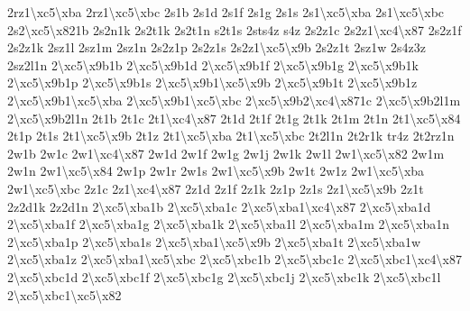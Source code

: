 {2rz1\textbackslash{}xc5\textbackslash{}xba 2rz1\textbackslash{}xc5\textbackslash{}xbc 2s1b 2s1d 2s1f 2s1g 2s1s 2s1\textbackslash{}xc5\textbackslash{}xba 2s1\textbackslash{}xc5\textbackslash{}xbc 2s2\textbackslash{}xc5\textbackslash{}x821b 2s2n1k 2s2t1k 2s2t1n s2t1s 2sts4z s4z 2s2z1c 2s2z1\textbackslash{}xc4\textbackslash{}x87 2s2z1f 2s2z1k 2sz1l 2sz1m 2sz1n 2s2z1p 2s2z1s 2s2z1\textbackslash{}xc5\textbackslash{}x9b 2s2z1t 2sz1w 2s4z3z 2sz2l1n 2\textbackslash{}xc5\textbackslash{}x9b1b 2\textbackslash{}xc5\textbackslash{}x9b1d 2\textbackslash{}xc5\textbackslash{}x9b1f 2\textbackslash{}xc5\textbackslash{}x9b1g 2\textbackslash{}xc5\textbackslash{}x9b1k 2\textbackslash{}xc5\textbackslash{}x9b1p 2\textbackslash{}xc5\textbackslash{}x9b1s 2\textbackslash{}xc5\textbackslash{}x9b1\textbackslash{}xc5\textbackslash{}x9b 2\textbackslash{}xc5\textbackslash{}x9b1t 2\textbackslash{}xc5\textbackslash{}x9b1z 2\textbackslash{}xc5\textbackslash{}x9b1\textbackslash{}xc5\textbackslash{}xba 2\textbackslash{}xc5\textbackslash{}x9b1\textbackslash{}xc5\textbackslash{}xbc 2\textbackslash{}xc5\textbackslash{}x9b2\textbackslash{}xc4\textbackslash{}x871c 2\textbackslash{}xc5\textbackslash{}x9b2l1m 2\textbackslash{}xc5\textbackslash{}x9b2l1n 2t1b 2t1c 2t1\textbackslash{}xc4\textbackslash{}x87 2t1d 2t1f 2t1g 2t1k 2t1m 2t1n 2t1\textbackslash{}xc5\textbackslash{}x84 2t1p 2t1s 2t1\textbackslash{}xc5\textbackslash{}x9b 2t1z 2t1\textbackslash{}xc5\textbackslash{}xba 2t1\textbackslash{}xc5\textbackslash{}xbc 2t2l1n 2t2r1k tr4z 2t2rz1n 2w1b 2w1c 2w1\textbackslash{}xc4\textbackslash{}x87 2w1d 2w1f 2w1g 2w1j 2w1k 2w1l 2w1\textbackslash{}xc5\textbackslash{}x82 2w1m 2w1n 2w1\textbackslash{}xc5\textbackslash{}x84 2w1p 2w1r 2w1s 2w1\textbackslash{}xc5\textbackslash{}x9b 2w1t 2w1z 2w1\textbackslash{}xc5\textbackslash{}xba 2w1\textbackslash{}xc5\textbackslash{}xbc 2z1c 2z1\textbackslash{}xc4\textbackslash{}x87 2z1d 2z1f 2z1k 2z1p 2z1s 2z1\textbackslash{}xc5\textbackslash{}x9b 2z1t 2z2d1k 2z2d1n 2\textbackslash{}xc5\textbackslash{}xba1b 2\textbackslash{}xc5\textbackslash{}xba1c 2\textbackslash{}xc5\textbackslash{}xba1\textbackslash{}xc4\textbackslash{}x87 2\textbackslash{}xc5\textbackslash{}xba1d 2\textbackslash{}xc5\textbackslash{}xba1f 2\textbackslash{}xc5\textbackslash{}xba1g 2\textbackslash{}xc5\textbackslash{}xba1k 2\textbackslash{}xc5\textbackslash{}xba1l 2\textbackslash{}xc5\textbackslash{}xba1m 2\textbackslash{}xc5\textbackslash{}xba1n 2\textbackslash{}xc5\textbackslash{}xba1p 2\textbackslash{}xc5\textbackslash{}xba1s 2\textbackslash{}xc5\textbackslash{}xba1\textbackslash{}xc5\textbackslash{}x9b 2\textbackslash{}xc5\textbackslash{}xba1t 2\textbackslash{}xc5\textbackslash{}xba1w 2\textbackslash{}xc5\textbackslash{}xba1z 2\textbackslash{}xc5\textbackslash{}xba1\textbackslash{}xc5\textbackslash{}xbc 2\textbackslash{}xc5\textbackslash{}xbc1b 2\textbackslash{}xc5\textbackslash{}xbc1c 2\textbackslash{}xc5\textbackslash{}xbc1\textbackslash{}xc4\textbackslash{}x87 2\textbackslash{}xc5\textbackslash{}xbc1d 2\textbackslash{}xc5\textbackslash{}xbc1f 2\textbackslash{}xc5\textbackslash{}xbc1g 2\textbackslash{}xc5\textbackslash{}xbc1j 2\textbackslash{}xc5\textbackslash{}xbc1k 2\textbackslash{}xc5\textbackslash{}xbc1l 2\textbackslash{}xc5\textbackslash{}xbc1\textbackslash{}xc5\textbackslash{}x82 }
